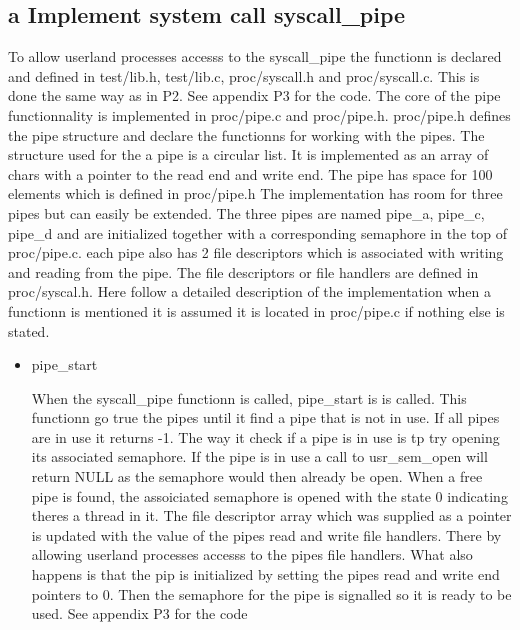 \documentclass[a4paper,12pt,danish]{report}
\begin{document}
\subsection{a Implement system call syscall\_pipe}
To allow userland processes
accesss to the syscall\_pipe the functionn is declared and defined in test/lib.h,
test/lib.c, proc/syscall.h and proc/syscall.c. This is done the same way as in P2.
See appendix P3 for the code. The core of the pipe functionnality is implemented
in proc/pipe.c and proc/pipe.h. proc/pipe.h defines the pipe structure and
declare the functionns for working with the pipes. The structure used for the
a pipe is a circular list. It is implemented as an array of chars with a pointer
to the read end and write end. The pipe has space for 100 elements which is
defined in proc/pipe.h The implementation has room for three pipes but can
easily be extended. The three  pipes are named pipe\_a, pipe\_c, pipe\_d and
are initialized together with a corresponding semaphore in the top of proc/pipe.c.
each pipe also has 2 file descriptors which is associated with writing and
reading from the pipe. The file descriptors or file handlers are defined in
proc/syscal.h. Here follow a detailed description of the implementation
when a functionn is mentioned it is assumed it is located in proc/pipe.c if nothing else is stated.
\begin{itemize}
	\item{pipe\_start}

	When the syscall\_pipe functionn is called,
	pipe\_start is is called. This functionn go true the	pipes until it find a pipe
	that is not in use. If all pipes are in use it returns -1. The way it check if
	a pipe is in use is tp try opening its associated semaphore. If the pipe is in
	use a call to usr\_sem\_open will return NULL as the semaphore would then
	already be open. When a free pipe is found, the assoiciated semaphore is
	opened with the state 0 indicating theres a thread in it. The file descriptor
	array which was supplied as a pointer is updated with the value of the pipes read and write file handlers. There by allowing userland processes accesss to the pipes
	file handlers. What also happens is that the pip is initialized by setting the
	pipes read and write end pointers to 0. Then the semaphore for the pipe is
	signalled so it is ready to be used. See appendix P3 for the code
		 
\end{itemize}
\end{document}
